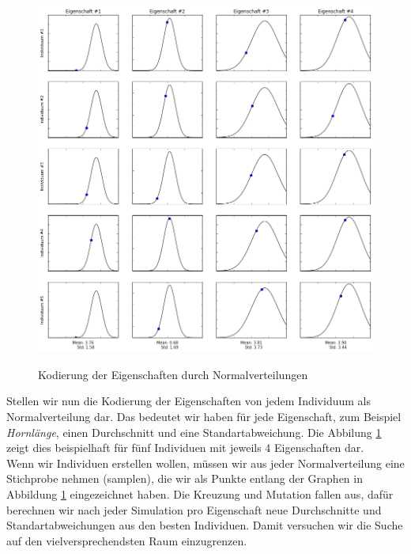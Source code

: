             \begin{figure}[H]
                    \begin{center}
                        \includegraphics[scale=0.47]{../pictures/diagrams/cross-entropy-visualization-ga.png}\\
                        \caption{Kodierung der Eigenschaften durch Normalverteilungen}\label{fig:norm-dist-encoding}
                    \end{center}
            \end{figure}

            Stellen wir nun die Kodierung der Eigenschaften von jedem Individuum als Normalverteilung dar. Das bedeutet wir haben für jede Eigenschaft, zum Beispiel \textit{Hornlänge}, einen Durchschnitt und eine Standartabweichung. Die Abbilung \ref{fig:norm-dist-encoding} zeigt dies beispielhaft für fünf Individuen mit jeweils 4 Eigenschaften dar.\\[3mm]

            \newpage
            \noindent
            Wenn wir Individuen erstellen wollen, müssen wir aus jeder Normalverteilung eine Stichprobe nehmen (samplen), die wir als Punkte entlang der Graphen in Abbildung \ref{fig:norm-dist-encoding} eingezeichnet haben. Die Kreuzung und Mutation fallen aus, dafür berechnen wir nach jeder Simulation pro Eigenschaft neue Durchschnitte und Standartabweichungen aus den besten Individuen. Damit versuchen wir die Suche auf den vielversprechendsten Raum einzugrenzen.\\

